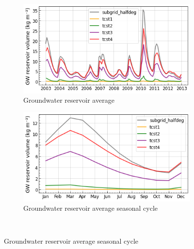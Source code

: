 \begin{figure}[htbp]
    \centering
    \begin{subfigure}[b]{0.48\textwidth}
        \caption{Groundwater reservoir average}
        \includegraphics[width=\textwidth]{images/chap3/time_series/slowr_time_series_tcsts.png}
    \end{subfigure}
    \begin{subfigure}[b]{0.48\textwidth}
        \caption{Groundwater reservoir average seasonal cycle}
        \includegraphics[width=\textwidth]{images/chap3/time_series/slowr_seasonal_cycle_tcsts.png}
    \end{subfigure} \\
    

\end{figure}
